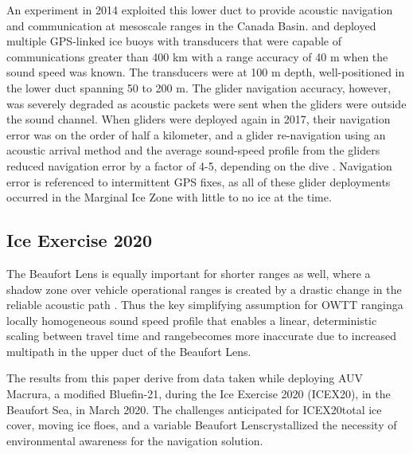 An experiment in 2014 exploited this lower duct to provide acoustic navigation and communication at mesoscale ranges in the Canada Basin.
\citet{freitag_long_2015} and \citet{webster_towards_2015} deployed multiple GPS-linked ice buoys with transducers that were capable of communications greater than 400 km with a range accuracy of 40 m when the sound speed was known.
The transducers were at 100 m depth, well-positioned in the lower duct spanning 50 to 200 m.
The glider navigation accuracy, however, was severely degraded as acoustic packets were sent when the gliders were outside the sound channel.
When gliders were deployed again in 2017, their navigation error was on the order of half a kilometer, and a glider re-navigation using an acoustic arrival method and the average sound-speed profile from the gliders reduced navigation error by a factor of 4-5, depending on the dive \citep{graupe_preliminary_2019}.
Navigation error is referenced to intermittent GPS fixes, as all of these glider deployments occurred in the Marginal Ice Zone with little to no ice at the time.

\subsection{Ice Exercise 2020}

The Beaufort Lens is equally important for shorter ranges as well, where a shadow zone over vehicle operational ranges is created by a drastic change in the reliable acoustic path \citep{schmidt_acoustic_2016}.
Thus the key simplifying assumption for OWTT ranging\textemdash a locally homogeneous sound speed profile that enables a linear, deterministic scaling between travel time and range\textemdash becomes more inaccurate due to increased multipath in the upper duct of the Beaufort Lens.

The results from this paper derive from data taken while deploying AUV Macrura, a modified Bluefin-21, during the Ice Exercise 2020 (ICEX20), in the Beaufort Sea, in March 2020.
The challenges anticipated for ICEX20\textemdash total ice cover, moving ice floes, and a variable Beaufort Lens\textemdash crystallized the necessity of environmental awareness for the navigation solution.

